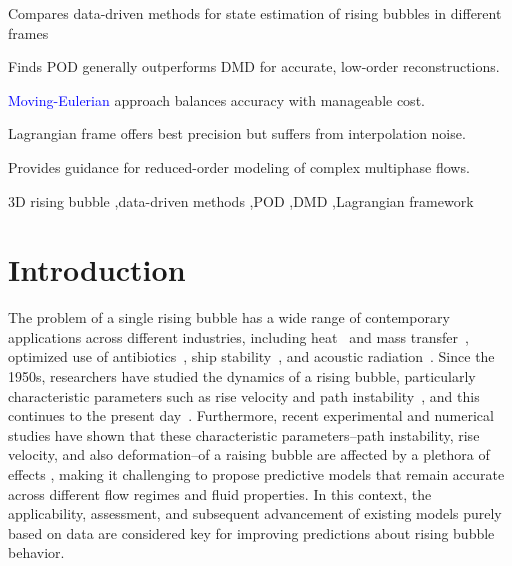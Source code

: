 \documentclass[a4paper,fleqn]{cas-sc}
\newcommand{\hl}[1]{\textcolor{blue}{#1}} %
\newcommand{\hl}[1]{#1} %
\begin{document}
	\begin{highlights}
		\item Compares data-driven methods for state estimation of rising bubbles in different frames
		\item Finds POD generally outperforms DMD for accurate, low-order reconstructions.
		\item \hl{Moving-Eulerian} approach balances accuracy with manageable cost.
		\item Lagrangian frame offers best precision but suffers from interpolation noise.
		\item Provides guidance for reduced-order modeling of complex multiphase flows.
	\end{highlights}
	
	
	\begin{keywords}
		3D rising bubble \sep data-driven methods \sep POD \sep DMD \sep Lagrangian framework
	\end{keywords}
	
	\maketitle
	
	\linenumbers
	
	\section{Introduction}
	\label{Introduction}
	
	The problem of a single rising bubble has a wide range of contemporary applications across different industries, including heat~\cite{Larimi2018} and mass transfer~\cite{Kentheswaran2023}, optimized use of antibiotics~\cite{Hamdollahi2022}, ship stability~\cite{Fang2022}, and acoustic radiation~\cite{Ouyang2021}. Since the 1950s, researchers have studied the dynamics of a rising bubble, particularly characteristic parameters such as rise velocity and path instability~\cite{Saffman1956,TSUGE1977,Duineveld1995}, and this continues to the present day~\cite{Shi2024,Bonnefis2024,Hosen2024}. Furthermore, recent experimental and numerical studies have shown that these characteristic parameters--path instability, rise velocity, and also deformation--of a raising bubble are affected by a plethora of effects \cite{Liu2006,Cano-Lozano2016,Kure2021}, making it challenging to propose predictive models that remain accurate across different flow regimes and fluid properties. In this context, the applicability, assessment, and subsequent advancement of existing models purely based on data are considered key for improving predictions about rising bubble behavior.
	
\end{document}
